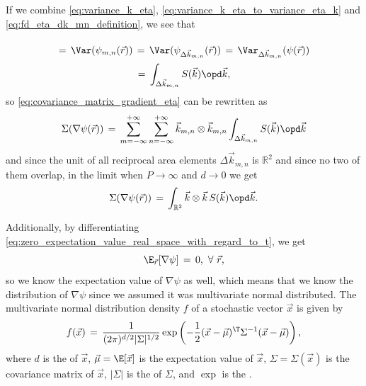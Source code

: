 If we combine \eqref{eq:variance_k_eta}, \eqref{eq:variance_k_eta_to_variance_eta_k} and \eqref{eq:fd_eta_dk_mn_definition}, we see that
%
\begin{equation}
\renewcommand*{\arraystretch}{2}
\begin{array}{c}
\displaystyle =\,\Var(\psi_{m,n}(\vec{r})) \,=\, \Var(\psi_{\Delta\vec{k}_{m,n}}(\vec{r})) \,=\, \Var_{\Delta\vec{k}_{m,n}}(\psi(\vec{r})) \\
\displaystyle =\, \int_{\Delta\vec{k}_{m,n}}S(\vec{k})\opd\vec{k},
\end{array}
\end{equation}
%
so \eqref{eq:covariance_matrix_gradient_eta} can be rewritten as
%
\begin{equation}
\Sigma(\nabla\psi(\vec{r})) \,=\, \sum_{m=-\infty}^{+\infty}\sum_{n=-\infty}^{+\infty}\vec{k}_{m,n}\otimes\vec{k}_{m,n} \int_{\Delta\vec{k}_{m,n}}S(\vec{k})\opd\vec{k}
\end{equation}
%
and since the unit of all reciprocal area elements $\Delta\vec{k}_{m,n}$ is $\mathbb{R}^2$ and since no two of them overlap, in the limit when $P\to\infty$ and $d\to 0$ we get
%
\begin{equation} \label{eq:covariance_matrix_gradient_eta_final}
\Sigma(\nabla\psi(\vec{r})) \,=\, \int_{\mathbb{R}^2}\vec{k}\otimes\vec{k}\,S(\vec{k})\opd\vec{k}.
\end{equation}

Additionally, by differentiating \eqref{eq:zero_expectation_value_real_space_with_regard_to_t}, we get
%
\begin{equation} \label{eq:psi_of_r_expectation_value}
\E_{\vec{r}}[\nabla\psi] \,=\, 0,\ \forall\ \vec{r},
\end{equation}
%
so we know the expectation value of $\nabla\psi$ as well, which means that we know the distribution of $\nabla\psi$ since we assumed it was multivariate normal distributed. The multivariate normal distribution density $f$ of a stochastic vector $\vec{x}$ is given by
%
\begin{equation} \label{eq:multivariate_normal_distribution_density}
f(\vec{x}) \,=\, \frac{1}{(2\pi)^{d/2}|\Sigma|^{1/2}}\exp\left(-\frac{1}{2}(\vec{x}-\vec{\mu})^{\T}\Sigma^{-1}(\vec{x}-\vec{\mu})\right),
\end{equation}
%
where $d$ is the \dimensionality of $\vec{x}$, $\vec{\mu} = \E[\vec{x}]$ is the expectation value of $\vec{x}$, $\Sigma = \Sigma(\vec{x})$ is the covariance matrix of $\vec{x}$, $|\Sigma|$ is the \determinant of $\Sigma$, and $\exp$ is the .

